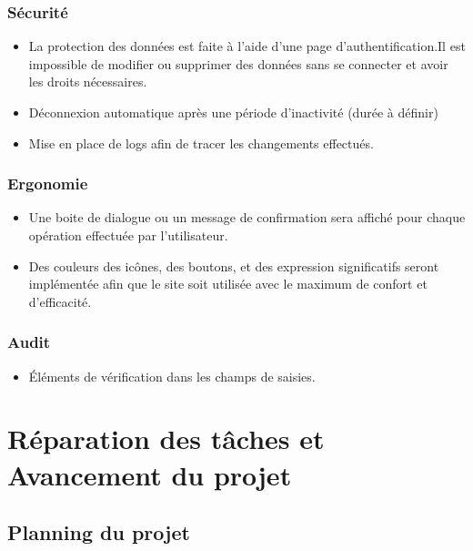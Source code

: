 \documentclass[12pt,a4paper]{article}
\begin{document}
\subsubsection{Sécurité}
\begin{itemize}
 \item La protection des données est faite à l'aide d'une page d'authentification.Il est impossible de modifier ou supprimer des données sans se connecter et avoir les droits nécessaires. 
 \item Déconnexion automatique après une période d'inactivité (durée à définir)
 \item Mise en place de logs afin de tracer les changements effectués.
\end{itemize}
\subsubsection{Ergonomie}
\begin{itemize}
\item Une boite de dialogue ou un message de confirmation sera affiché pour chaque opération effectuée par l'utilisateur.
\item Des couleurs des icônes, des boutons, et des expression significatifs seront implémentée afin que le site soit utilisée avec le maximum de confort et d'efficacité.
\end{itemize}
\subsubsection{Audit}
\begin{itemize}
\item Éléments de vérification dans les champs de saisies.
\end{itemize}

\section{Réparation des tâches et Avancement du projet}

\subsection{Planning du projet}
\end{document}
